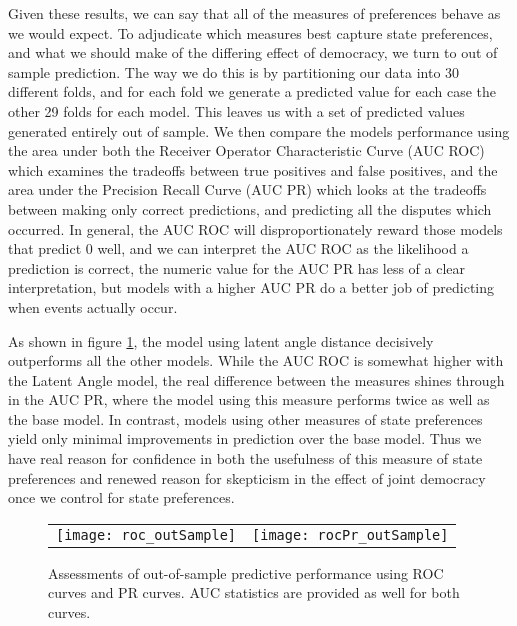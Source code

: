 Given these results, we can say that all of the measures of preferences behave as we would expect. To adjudicate which measures best capture state preferences, and what we should make of the differing effect of democracy, we turn to out of sample prediction. The way we do this is by partitioning our data into 30 different folds, and for each fold we generate a predicted value for each case the other 29 folds for each model. This leaves us with a set of predicted values generated entirely out of sample. We then compare the models performance using the area under both the Receiver Operator Characteristic Curve (AUC ROC) which examines the tradeoffs between true positives and false positives, and the area under the Precision Recall Curve (AUC PR) which looks at the tradeoffs between making only correct predictions, and predicting all the disputes which occurred. In general, the AUC ROC will disproportionately reward those models that predict $0$ well, and we can interpret the AUC ROC as the likelihood a prediction is correct, the numeric value for the AUC PR has less of a clear interpretation, but models with a higher AUC PR do a better job of predicting when events actually occur.

As shown in figure \ref{fig:roc}, the model using latent angle distance decisively outperforms all the other models. While the AUC ROC is somewhat higher with the Latent Angle model, the real difference between the measures shines through in the AUC PR, where the model using this measure performs twice as well as the base model. In contrast, models using other measures of state preferences yield only minimal improvements in prediction over the base model. Thus we have real reason for confidence in both the usefulness of this measure of state preferences and renewed reason for skepticism in the effect of joint democracy once we control for state preferences. 

\begin{figure}[ht]
	\centering
	\begin{tabular}{cc}
	\texttt{[image: roc\_outSample]} & 
	\texttt{[image: rocPr\_outSample]}	
	\end{tabular}
	\caption{Assessments of out-of-sample predictive performance using ROC curves and PR curves. AUC statistics are provided as well for both curves.}
	\label{fig:roc}
\end{figure}
\FloatBarrier
